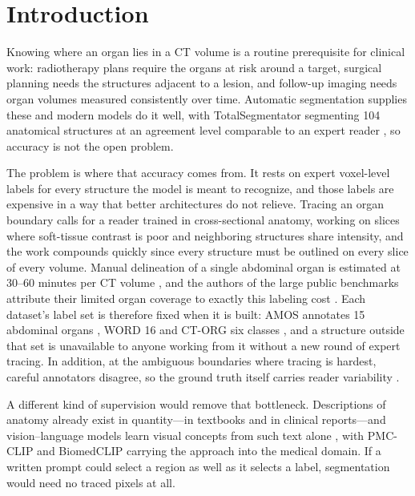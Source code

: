 \documentclass[10pt]{article}
\begin{document}
\clearpage

\section{Introduction}
\label{sec:intro}

Knowing where an organ lies in a CT volume is a routine prerequisite for clinical
work: radiotherapy plans require the organs at risk around a target, surgical
planning needs the structures adjacent to a lesion, and follow-up imaging needs
organ volumes measured consistently over time. Automatic segmentation supplies
these and modern models do it well, with TotalSegmentator segmenting 104
anatomical structures at an agreement level comparable to an expert reader
\cite{wasserthal2023totalsegmentator}, so accuracy is not the open problem.

The problem is where that accuracy comes from. It rests on expert voxel-level
labels for every structure the model is meant to recognize, and those labels are
expensive in a way that better architectures do not relieve. Tracing an organ
boundary calls for a reader trained in cross-sectional anatomy, working on slices
where soft-tissue contrast is poor and neighboring structures share intensity, and
the work compounds quickly since every structure must be outlined on every slice of
every volume. Manual delineation of a single abdominal organ is estimated at 30--60
minutes per CT volume \cite{qu2023abdomenatlas}, and the authors of the large
public benchmarks attribute their limited organ coverage to exactly this labeling
cost \cite{ji2022amos, qu2023abdomenatlas}. Each dataset's label set is therefore
fixed when it is built: AMOS annotates 15 abdominal organs \cite{ji2022amos},
WORD 16 \cite{luo2022word} and CT-ORG six classes \cite{rister2020ctorg}, and a
structure outside that set is unavailable to anyone working from it without a new
round of expert tracing. In addition, at the ambiguous
boundaries where tracing is hardest, careful annotators disagree, so the ground
truth itself carries reader variability \cite{nikolov2021nsd}.

A different kind of supervision would remove that bottleneck. Descriptions of
anatomy already exist in quantity---in textbooks and in clinical reports---and
vision--language models learn visual concepts from such text alone
\cite{radford2021clip, zhai2023siglip}, with PMC-CLIP \cite{lin2023pmcclip} and
BiomedCLIP \cite{zhang2025biomedclip} carrying the approach into the medical
domain. If a written prompt could select a region as well as it selects a label,
segmentation would need no traced pixels at all.
\end{document}
